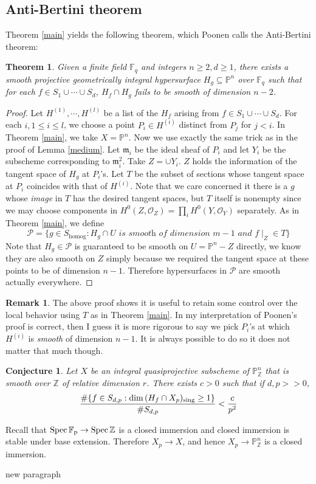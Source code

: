 \documentclass[12pt]{article}
\theoremstyle{plain}
\newtheorem{theorem}[equation]{Theorem}
\newtheorem{conjecture}[equation]{Conjecture}
\theoremstyle{definition}
\newtheorem{remark}[equation]{Remark}
\newcommand{\fm}{\mathfrak{m}}
\newcommand{\IF}{\mathbb{F}}
\newcommand{\IP}{\mathbb{P}}
\newcommand{\IZ}{\mathbb{Z}}
\newcommand{\sO}{\mathcal{O}}
\newcommand{\sP}{\mathcal{P}}
\newcommand{\Spec}{\rm Spec\,}
\renewcommand\dim{{\rm dim\,}}
\newcommand{\<}{\langle}
\renewcommand{\>}{\rangle}
\newcommand{\sing}{\mathrm{sing}}
\begin{document}
\subsection{Anti-Bertini theorem}
Theorem \ref{main} yields the following theorem, which Poonen calls the Anti-Bertini theorem:
\begin{theorem}
\label{anti}
Given a finite field $\IF_q$ and integers $n \ge 2, d \ge 1$, there exists a smooth projective geometrically integral hypersurface $H_g \subseteq \IP^n$ over $\IF_q$ such that for each $f \in S_1 \cup \cdots \cup S_d$, $H_f \cap H_g$ fails to be smooth of dimension $n - 2$. 
\end{theorem}
\begin{proof}
Let $H^{(1)}, \cdots, H^{(l)}$ be a list of the $H_f$ arising from $f \in S_1 \cup \cdots \cup S_d$. For each $i, 1\le i \le l$, we choose a point $P_i \in H^{(i)}$ distinct from $P_j$ for $j < i$. In Theorem \ref{main}, we take $X = \IP^n$. Now we use exactly the same trick as in the proof of Lemma \ref{medium}. Let $\fm_i$ be the ideal sheaf of $P_i$ and let $Y_i$ be the subscheme corresponding to $\fm_i^2$. Take $Z = \cup Y_i$. $Z$ holds the information of the tangent space of $H_g$ at $P_i$'s. Let $T$ be the subset of sections whose tangent space at $P_i$ coincides with that of $H^{(i)}$. Note that we care concerned it there is a $g$ whose \textit{image} in $T$ has the desired tangent spaces, but $T$ itself is nonempty since we may choose components in $H^0(Z, \sO_Z) = \prod_i H^0(Y, \sO_Y)$ separately. As in Theorem \ref{main}, we define 
$$ \sP = \{ g \in S_\mathrm{homog} : H_g \cap U \textit{ is smooth of dimension }m - 1 \textit{ and }f\mid_Z \in T \}$$
Note that $H_g \in \sP$ is guaranteed to be smooth on $U = \IP^n - Z$ directly, we know they are also smooth on $Z$ simply because we required the tangent space at these points to be of dimension $n - 1$. Therefore hypersurfaces in $\sP$ are smooth actually everywhere. 
\end{proof}
\begin{remark}
The above proof shows it is useful to retain some control over the local behavior using $T$ as in Theorem \ref{main}. In my interpretation of Poonen's proof is correct, then I guess it is more rigorous to say we pick $P_i$'s at which $H^{(i)}$ is \textit{smooth} of dimension $n - 1$. It is always possible to do so it does not matter that much though. 
\end{remark}

\begin{conjecture}
Let $X$ be an integral quasiprojective subscheme of $\IP_\IZ^n$ that is smooth over $\IZ$ of relative dimension $r$. There exists $c > 0$ such that if $d, p >>0$, 
$$\frac{\#\{f \in S_{d,p} : \dim(H_f \cap X_p)_\sing \ge 1\}}{\# S_{d,p}} < \frac{c}{p^2}$$
\end{conjecture}
Recall that $\Spec \IF_p \to \Spec \IZ$ is a closed immersion and closed immersion is stable under base extension. Therefore $X_p \to X$, and hence $X_p \to \IP_\IZ^n$ is a closed immersion. 
\par new paragraph
\end{document}
